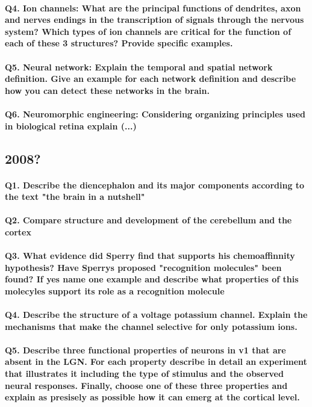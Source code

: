 \documentclass[12pt,article,oneside,a4paper]{memoir}
\begin{document}
\paragraph{Q4. Ion channels: What are the principal functions of dendrites, axon and nerves endings in the transcription of signals through the nervous system? Which types of ion channels are critical for the function of each of these 3 structures? Provide specific examples.}
\paragraph{Q5. Neural network: Explain the temporal and spatial network definition. Give an example for each network definition and describe how you can detect these networks in the brain.}
\paragraph{Q6. Neuromorphic engineering: Considering organizing principles used in biological retina explain (...)}

\subsection{2008?}
\paragraph{Q1. Describe the diencephalon and its major components according to the text "the brain in a nutshell"}
\paragraph{Q2. Compare structure and development of the cerebellum and the cortex}
\paragraph{Q3. What evidence did Sperry find that supports his chemoaffinnity hypothesis? Have Sperrys proposed "recognition molecules" been found? If yes name one example and describe what properties of this molecyles support its role as a recognition molecule}
\paragraph{Q4. Describe the structure of a voltage potassium channel. Explain the mechanisms that make the channel selective for only potassium ions.}
\paragraph{Q5. Describe three functional properties of neurons in v1 that are absent in the LGN. For each property describe in detail an experiment that illustrates it including the type of stimulus and the observed neural responses. Finally, choose one of these three properties and explain as presisely as possible how it can emerg at the cortical level.}
\end{document}

